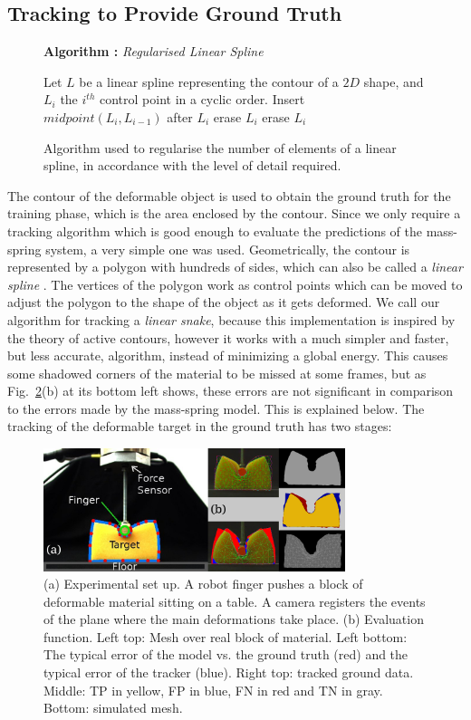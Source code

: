 \documentclass[journal]{IEEEtran}
\newcommand{\fref}[1]{Fig.~\ref{#1}}
\newcounter{algorithm}
\newenvironment{algorithmicieee}[1]
  {\refstepcounter{algorithm}
   \begin{lrbox}{\ieeealgbox}
   \begin{minipage}{\dimexpr\columnwidth-2\fboxsep-2\fboxrule}
   \textbf{Algorithm \arabic{algorithm}:} \textit{#1} \par
   \begin{algorithmic}[1]}
  {\end{algorithmic}
   \end{minipage}
   \end{lrbox}\noindent\fbox{\usebox{\ieeealgbox}}}
\begin{document}
\subsection{Tracking to Provide Ground Truth}
\begin{figure}[!t]
 \begin{algorithmicieee}{Regularised Linear Spline}\label{alg:regularise}
 \STATE Let $L$ be a linear spline representing the contour of a $2D$ shape, and $L_i$ the $i^{th}$ control point in a cyclic order.
  \STATE Insert $midpoint(L_i,L_{i-1})$ after $L_i$
  \STATE erase $L_i$
  \STATE erase $L_i$
 \ENDIF
 \ENDFOR
\end{algorithmicieee}
\caption{Algorithm used to regularise the number of elements of a linear spline, in accordance with the level of detail required.}
\end{figure}
 The contour of the deformable object is used to obtain the ground truth for the training phase, which is the area enclosed by the contour. Since we only require a tracking algorithm which is good enough to evaluate the predictions of the mass-spring system, a very simple one was used.  Geometrically, the contour is represented by a polygon with hundreds of sides, which can also be called a \textit{linear spline} \cite{Menet1991}. The vertices of the polygon work as control points which can be moved to adjust the polygon to the shape of the object as it gets deformed.  We call our algorithm for tracking a \emph{linear snake}, because this implementation is inspired by the theory of active contours, however it works with a much simpler and faster, but less accurate, algorithm, instead of minimizing a global energy.  This causes some shadowed corners of the material to be missed at some frames, but as \fref{fig:scene}(b) at its bottom left shows, these errors are not significant in comparison to the errors made by the mass-spring model.  This is explained below.  The tracking of the deformable target in the ground truth has two stages:
 \begin{figure}[t]
\centering
\includegraphics[width=88mm]{arrio2}
\caption{(a) Experimental set up.  A robot finger pushes a block of deformable material sitting on a table.  A camera registers the events of the plane where the main deformations take place.  (b) Evaluation function.  Left top: Mesh over real block of material.  Left bottom: The typical error of the model vs. the ground truth (red) and the typical error of the tracker (blue).  Right top: tracked ground data.  Middle: TP in yellow, FP in blue, FN in red and TN in gray.  Bottom: simulated mesh. }
\label{fig:scene}
\end{figure}
\end{document}
